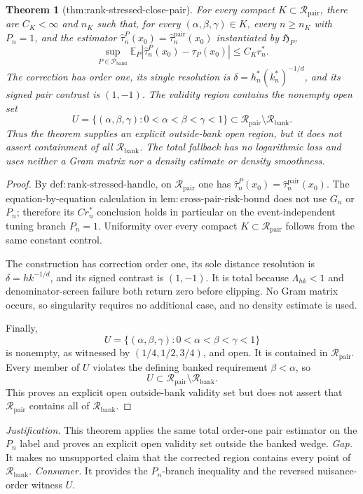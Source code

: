 \documentclass{article}
\newtheorem{theorem}{Theorem}
\begin{document}
\begin{theorem}[thm:rank-stressed-close-pair]\label{thm:rank-stressed-close-pair}
For every compact \(K\subset\mathcal R_{\mathrm{pair}}\), there are \(C_K<\infty\) and \(n_K\) such that, for every \((\alpha,\beta,\gamma)\in K\), every \(n\geq n_K\) with \(P_n=1\), and the estimator \(\widehat\tau_n^P(x_0)=\widehat\tau_n^{\mathrm{pair}}(x_0)\) instantiated by \(\mathfrak H_P\),
\[
 \sup_{P\in\mathcal P_{\mathrm{band}}}
 \mathbb E_P\left|\widehat\tau_n^P(x_0)-\tau_P(x_0)\right|\leq C_Kr_n^*.
\]
The correction has order one, its single resolution is \(\delta=h_n^*(k_n^*)^{-1/d}\), and its signed pair contrast is \((1,-1)\).  The validity region contains the nonempty open set
\[
 U=\{(\alpha,\beta,\gamma):0<\alpha<\beta<\gamma<1\}
 \subset\mathcal R_{\mathrm{pair}}\setminus\mathcal R_{\mathrm{bank}}.
\]
Thus the theorem supplies an explicit outside-bank open region, but it does not assert containment of all \(\mathcal R_{\mathrm{bank}}\).  The total fallback has no logarithmic loss and uses neither a Gram matrix nor a density estimate or density smoothness.
\end{theorem}
\begin{proof}
By \(\mathrm{def:rank\mbox{-}stressed\mbox{-}handle}\), on \(\mathcal R_{\mathrm{pair}}\) one has
\(\widehat\tau_n^P(x_0)=\widehat\tau_n^{\mathrm{pair}}(x_0)\).  The equation-by-equation calculation in \(\mathrm{lem:cross\mbox{-}pair\mbox{-}risk\mbox{-}bound}\) does not use \(G_n\) or \(P_n\); therefore its \(C r_n^*\) conclusion holds in particular on the event-independent tuning branch \(P_n=1\).  Uniformity over every compact \(K\subset\mathcal R_{\mathrm{pair}}\) follows from the same constant control.

The construction has correction order one, its sole distance resolution is \(\delta=h k^{-1/d}\), and its signed contrast is \((1,-1)\).  It is total because \(\Lambda_{hk}<1\) and denominator-screen failure both return zero before clipping.  No Gram matrix occurs, so singularity requires no additional case, and no density estimate is used.

Finally,
\[
 U=\{(\alpha,\beta,\gamma):0<\alpha<\beta<\gamma<1\}
\]
is nonempty, as witnessed by \((1/4,1/2,3/4)\), and open.  It is contained in \(\mathcal R_{\mathrm{pair}}\).  Every member of \(U\) violates the defining banked requirement \(\beta<\alpha\), so
\[
 U\subset\mathcal R_{\mathrm{pair}}\setminus\mathcal R_{\mathrm{bank}}.
\]
This proves an explicit open outside-bank validity set but does not assert that \(\mathcal R_{\mathrm{pair}}\) contains all of \(\mathcal R_{\mathrm{bank}}\).
\end{proof}
\par\smallskip\noindent \textit{Justification.} This theorem applies the same total order-one pair estimator on the \(P_n\) label and proves an explicit open validity set outside the banked wedge. \textit{Gap.} It makes no unsupported claim that the corrected region contains every point of \(\mathcal R_{\mathrm{bank}}\). \textit{Consumer.} It provides the \(P_n\)-branch inequality and the reversed nuisance-order witness \(U\).
\end{document}
